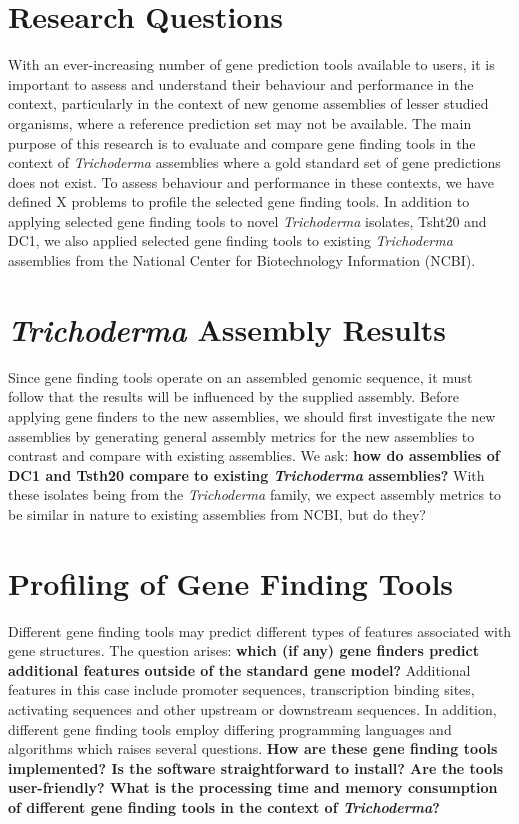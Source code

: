 \section{Research Questions}

With an ever-increasing number of gene prediction tools available to
users, it is important to assess and understand their behaviour and
performance in the context, particularly in the context of new genome
assemblies of lesser studied organisms, where a reference prediction
set may not be available. The main purpose of this research is to
evaluate and compare gene finding tools in the context of
\textit{Trichoderma} assemblies where a gold standard set of gene
predictions does not exist. To assess behaviour and performance in
these contexts, we have defined X problems to profile the selected
gene finding tools. In addition to applying selected gene finding
tools to novel \textit{Trichoderma} isolates, Tsht20 and DC1, we also
applied selected gene finding tools to existing \textit{Trichoderma}
assemblies from the National Center for Biotechnology Information
(NCBI).

\section{\textit{Trichoderma} Assembly Results}

Since gene finding tools operate on an assembled genomic sequence, it
must follow that the results will be influenced by the supplied
assembly. Before applying gene finders to the new assemblies, we
should first investigate the new assemblies by generating general
assembly metrics for the new assemblies to contrast and compare with
existing assemblies. We ask: \textbf{how do assemblies of DC1 and
  Tsth20 compare to existing \textit{Trichoderma} assemblies?} With
these isolates being from the \textit{Trichoderma} family, we expect
assembly metrics to be similar in nature to existing assemblies from
NCBI, but do they?

\section{Profiling of Gene Finding Tools}

Different gene finding tools may predict different types of features
associated with gene structures. The question arises: \textbf{which
  (if any) gene finders predict additional features outside of the
  standard gene model?} Additional features in this case include
promoter sequences, transcription binding sites, activating sequences
and other upstream or downstream sequences. In addition, different
gene finding tools employ differing programming languages and
algorithms which raises several questions. \textbf{How are these gene
  finding tools implemented? Is the software straightforward to
  install? Are the tools user-friendly? What is the processing time
  and memory consumption of different gene finding tools in the
  context of \textit{Trichoderma}?}

